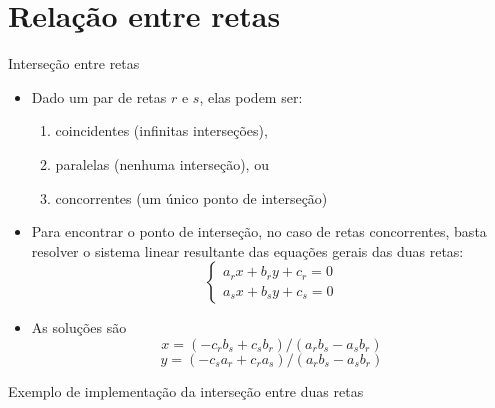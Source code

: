 \section{Relação entre retas}

\begin{frame}[fragile]{Interseção entre retas}

    \begin{itemize}
        \item Dado um par de retas $r$ e $s$, elas podem ser:
        \pause

        \begin{enumerate}
            \item coincidentes (infinitas interseções),
            \pause

            \item paralelas (nenhuma interseção), ou
            \pause

            \item concorrentes (um único ponto de interseção)
        \end{enumerate}
        \pause

        \item Para encontrar o ponto de interseção, no caso de retas concorrentes, basta resolver o sistema linear resultante das equações gerais das duas retas:
        \[
            \left\lbrace \begin{array}{l} a_rx + b_ry + c_r = 0 \\ a_sx + b_sy + c_s = 0
            \end{array} \right.
        \]
        \pause

        \item As soluções são
        \[
            x = (-c_r b_s + c_s b_r) / (a_rb_s - a_sb_r)
        \]
        \[
            y = (-c_sa_r + c_ra_s) / (a_rb_s - a_sb_r)
        \]

    \end{itemize}

\end{frame}

\begin{frame}[fragile]{Exemplo de implementação da interseção entre duas retas}
\end{frame}

